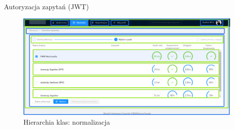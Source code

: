 Autoryzacja zapytań (JWT)


\begin{figure}[H]
\centering
\includegraphics[width=0.7\linewidth]{06-implementacja/rys/modularyzacja.PNG}
\caption{Hierarchia klas: normalizacja}
\label{fig:criterion-classes}
\end{figure}